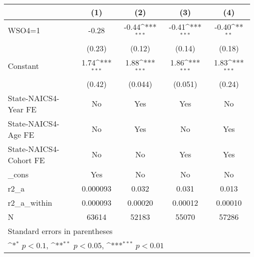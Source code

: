 {
\def\sym#1{\ifmmode^{#1}\else\(^{#1}\)\fi}
\begin{tabular}{l*{4}{c}}
\hline\hline
                    &\multicolumn{1}{c}{(1)}         &\multicolumn{1}{c}{(2)}         &\multicolumn{1}{c}{(3)}         &\multicolumn{1}{c}{(4)}         \\
\hline
WSO4=1              &       -0.28         &       -0.44\sym{***}&       -0.41\sym{***}&       -0.40\sym{**} \\
                    &      (0.23)         &      (0.12)         &      (0.14)         &      (0.18)         \\
[1em]
Constant            &        1.74\sym{***}&        1.88\sym{***}&        1.86\sym{***}&        1.83\sym{***}\\
                    &      (0.42)         &     (0.044)         &     (0.051)         &      (0.24)         \\
[1em]
State-NAICS4-Year FE&          No         &         Yes         &         Yes         &          No         \\
[1em]
State-NAICS4-Age FE &          No         &         Yes         &          No         &         Yes         \\
[1em]
State-NAICS4-Cohort FE&          No         &          No         &         Yes         &         Yes         \\
[1em]
\_cons              &         Yes         &          No         &          No         &          No         \\
\hline
r2\_a                &    0.000093         &       0.032         &       0.031         &       0.013         \\
r2\_a\_within         &    0.000093         &     0.00020         &     0.00012         &     0.00010         \\
N                   &       63614         &       52183         &       55070         &       57286         \\
\hline\hline
\multicolumn{5}{l}{\footnotesize Standard errors in parentheses}\\
\multicolumn{5}{l}{\footnotesize \sym{*} \(p<0.1\), \sym{**} \(p<0.05\), \sym{***} \(p<0.01\)}\\
\end{tabular}
}
